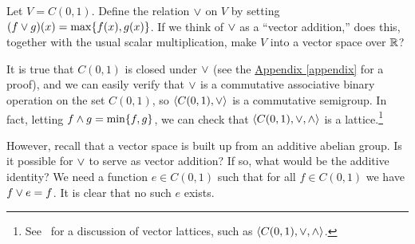 \begin{problem}[Golan 60]\hskip-2mm\protect\footnotemark
\label{prob:1}
\renewcommand\boxplus{\ensuremath{\join}}
Let $V = C(0,1)$. Define the relation $\boxplus$ on $V$ by setting 
$(f \boxplus g)(x)= \max \{f(x), g(x)\}$.  
If we think of $\boxplus$ as a ``vector addition,'' does this, together with the
usual scalar multiplication, make $V$ into a vector space over $\mathbb{R}$?

\end{problem}
\smallskip
\begin{solution}
It is true that $C(0,1)$ is closed under $\vee$ (see the
\hyperref[appendix]{Appendix \ref*{appendix}} for a
proof), and we can easily verify that $\vee$ is a commutative associative
binary operation on the set $C(0,1)$, so $\langle C(0,1), \vee\rangle$ is a 
commutative semigroup.  In fact, letting  
$f \wedge g = \min\{f, g\}$, we can check that $\langle C(0,1), \vee,
\wedge\rangle$  is a lattice.\footnote{See~\cite[Sec.~30]{Aliprantis:1998} for a
  discussion of vector lattices, such as $\langle C(0,1), \vee, \wedge\rangle$.}

However, recall that a vector space is built up from an additive abelian group.
Is it possible for $\vee$ to serve as vector addition?  If so, what would be
the additive identity?  We need a function $e \in C(0,1)$ such that for all $f
\in C(0,1)$ we have $f \vee e = f$.  It is clear that no such $e$ exists.

\end{solution}
\probskip



